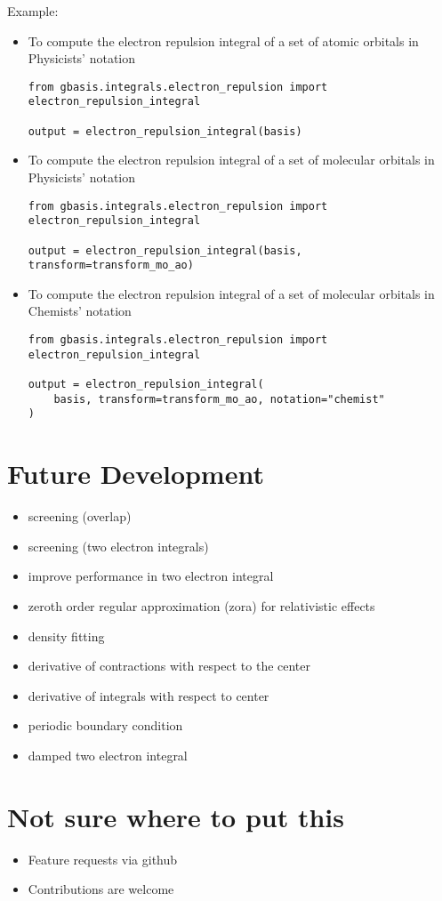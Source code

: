 \documentclass[letterpaper]{article}
\begin{document}
Example:
\begin{itemize}
\item To compute the electron repulsion integral of a set of atomic orbitals in
  Physicists' notation
  \begin{lstlisting}[xleftmargin=-25pt]
from gbasis.integrals.electron_repulsion import electron_repulsion_integral

output = electron_repulsion_integral(basis)
\end{lstlisting}
\item To compute the electron repulsion integral of a set of molecular orbitals in
  Physicists' notation
  \begin{lstlisting}[xleftmargin=-25pt]
from gbasis.integrals.electron_repulsion import electron_repulsion_integral

output = electron_repulsion_integral(basis, transform=transform_mo_ao)
\end{lstlisting}
\item To compute the electron repulsion integral of a set of molecular orbitals in
  Chemists' notation
  \begin{lstlisting}[xleftmargin=-25pt]
from gbasis.integrals.electron_repulsion import electron_repulsion_integral

output = electron_repulsion_integral(
    basis, transform=transform_mo_ao, notation="chemist"
)
\end{lstlisting}
\end{itemize}

\section{Future Development}
\begin{itemize}
\item screening (overlap)
\item screening (two electron integrals)
\item improve performance in two electron integral
\item zeroth order regular approximation (zora) for relativistic effects
\item density fitting
\item derivative of contractions with respect to the center
\item derivative of integrals with respect to center
\item periodic boundary condition
\item damped two electron integral
\end{itemize}

\section{Not sure where to put this}
\begin{itemize}
\item Feature requests via github
\item Contributions are welcome
\end{itemize}
\end{document}
